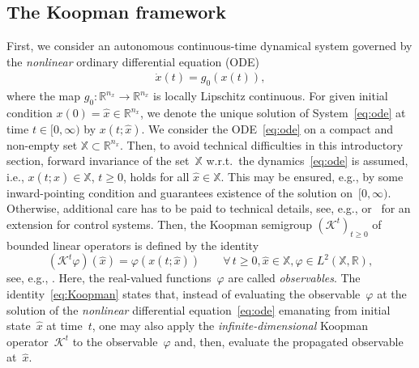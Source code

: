 \documentclass{article}
\numberwithin{equation}{section}
\newcommand{\R}{\mathbb{R}}
\newcommand{\nx}{n_x}
\newcommand{\bX}{\mathbb X}
\begin{document}
	
	
	\subsection{The Koopman framework} 
	
	First, we consider an autonomous continuous-time dynamical system governed by the \emph{nonlinear} ordinary differential equation (ODE)
	\begin{align}\label{eq:ode}
	\dot{x}(t) = g_0(x(t)),
	\end{align}
	where the map $g_0: \mathbb{R}^{\nx} \rightarrow \mathbb{R}^{\nx}$ is locally Lipschitz continuous. 
	For given initial condition $x(0) = \hat{x} \in \R^{\nx}$, we denote the unique solution of System~\eqref{eq:ode} at time $t \in [0,\infty)$ by $x(t;\hat{x})$. 
	We consider the ODE~\eqref{eq:ode} on a compact and non-empty set $\bX \subset \mathbb{R}^{\nx}$. Then, to avoid technical difficulties in this introductory section, forward invariance of the set~$\bX$ w.r.t.\ the dynamics~\eqref{eq:ode} is assumed, i.e., $x(t;\hat{x}) \in \mathbb{X}$, $t \geq 0$, holds for all $\hat{x} \in \mathbb{X}$. This may be ensured, e.g., by some inward-pointing condition and guarantees existence of the solution on~$[0,\infty)$. Otherwise, additional care has to be paid to technical details, see, e.g., \cite{ZhanZuaz23} or~\cite{SchaWort23} for an extension for control systems. Then, the Koopman semigroup $(\mathcal{K}^t)_{t \geq 0}$ of bounded linear operators is defined by the identity 
	\begin{equation}\label{eq:Koopman}
	(\mathcal{K}^t \varphi)(\hat{x}) = \varphi(x(t;\hat{x})) \qquad\forall\,t \geq 0, \hat{x} \in \bX, \varphi \in L^2(\bX,\mathbb{R}),
	\end{equation}
	see, e.g., \cite[Prop.~2.4]{MaurSusu20}. Here, the real-valued functions~$\varphi$ are called \emph{observables}. 
	The identity~\eqref{eq:Koopman} states that, instead of evaluating the observable~$\varphi$ at the solution of the \emph{nonlinear} differential equation~\eqref{eq:ode} emanating from initial state~$\hat{x}$ at time~$t$, one may also apply the \emph{infinite-dimensional} Koopman operator~$\mathcal{K}^t$ to the observable~$\varphi$ and, then, evaluate the propagated observable at~$\hat{x}$.
	
\end{document}
